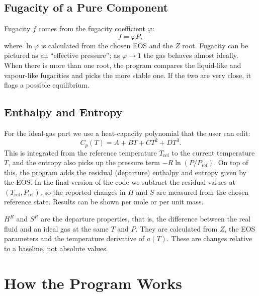 \documentclass[11pt,a4paper]{article}
\begin{document}
\subsection{Fugacity of a Pure Component}

Fugacity $f$ comes from the fugacity coefficient $\varphi$:
\begin{equation}
f = \varphi P ,
\label{eq:fug}
\end{equation}
where $\ln\varphi$ is calculated from the chosen EOS and the $Z$ root. Fugacity can be pictured as an ``effective pressure''; as $\varphi\to1$ the gas behaves almost ideally. When there is more than one root, the program compares the liquid-like and vapour-like fugacities and picks the more stable one. If the two are very close, it flags a possible equilibrium.

\subsection{Enthalpy and Entropy}

For the ideal-gas part we use a heat-capacity polynomial that the user can edit:
\begin{equation}
C_p(T) = A + BT + CT^2 + DT^3 .
\label{eq:cp}
\end{equation}
This is integrated from the reference temperature $T_{\mathrm{ref}}$ to the current temperature $T$, and the entropy also picks up the pressure term $-R\ln(P/P_{\mathrm{ref}})$. On top of this, the program adds the residual (departure) enthalpy and entropy given by the EOS. In the final version of the code we subtract the residual values at $(T_{\mathrm{ref}}, P_{\mathrm{ref}})$, so the reported changes in $H$ and $S$ are measured from the chosen reference state. Results can be shown per mole or per unit mass.

$H^R$ and $S^R$ are the departure properties, that is, the difference between the real fluid and an ideal gas at the same $T$ and $P$. They are calculated from $Z$, the EOS parameters and the temperature derivative of $a(T)$. These are changes relative to a baseline, not absolute values.

\section{How the Program Works}
\end{document}
